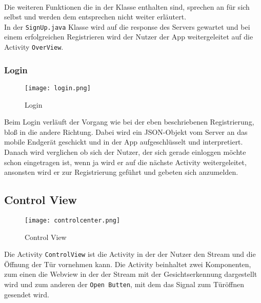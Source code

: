 \\
Die weiteren Funktionen die in der Klasse enthalten sind, sprechen an für sich selbst und werden dem entsprechen nicht weiter erläutert.
\\
In der \texttt{SignUp.java} Klasse wird auf die response des Servers gewartet und bei einem erfolgreichen Registrieren wird der Nutzer der App weitergeleitet auf die Activity \texttt{OverView}.
\newpage

 
\subsubsection{Login}
\begin{figure}[h]
  \begin{center}
    \texttt{[image: login.png]}
  		  \caption{Login}
     \label{fig.Prozess}
  \end{center}
\end{figure}

Beim Login verläuft der Vorgang wie bei der eben beschriebenen Registrierung, bloß in die andere Richtung. Dabei wird ein JSON-Objekt vom Server an das mobile Endgerät geschickt und in der App aufgeschlüsselt und interpretiert. Danach wird verglichen ob sich der Nutzer, der sich gerade einloggen möchte schon eingetragen ist, wenn ja wird er auf die nächste Activity weitergeleitet, ansonsten wird er zur Registrierung geführt und gebeten sich anzumelden.
\subsection{Control View}
\begin{figure}[h]
  \begin{center}
    \texttt{[image: controlcenter.png]}
  		  \caption{Control View}
     \label{fig.Prozess}
  \end{center}
\end{figure}
Die Activity \texttt{ControlView} ist die Activity in der der Nutzer den Stream und die Öffnung der Tür vornehmen kann. Die Activity beinhaltet zwei Komponenten, zum einen die Webview in der der Stream mit der Gesichtserkennung dargestellt wird und zum anderen der \texttt{Open Butten}, mit dem das Signal zum Türöffnen gesendet wird.

